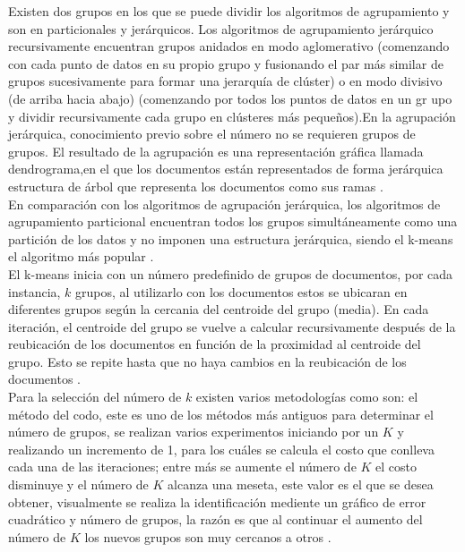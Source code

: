 Existen dos grupos en los que se puede dividir los algoritmos de agrupamiento y son en particionales y jerárquicos. Los algoritmos de agrupamiento jerárquico recursivamente encuentran grupos anidados en modo aglomerativo (comenzando con cada punto de datos en su propio grupo y fusionando el par más similar de grupos sucesivamente para formar una jerarquía de clúster) o en modo divisivo (de arriba hacia abajo) (comenzando por todos los puntos de datos en un gr upo y dividir recursivamente cada grupo en clústeres más pequeños).En la agrupación jerárquica, conocimiento previo sobre el número no se requieren grupos de grupos. El resultado de la agrupación es una representación gráfica llamada dendrograma,en el que los documentos están representados de forma jerárquica estructura de árbol que representa los documentos como sus ramas \cite{Renganathan2017,Jain2010}.\\

En comparación con los algoritmos de agrupación jerárquica, los algoritmos de agrupamiento  particional encuentran todos los grupos simultáneamente como una partición de los datos y no imponen una estructura jerárquica, siendo el k-means el algoritmo más popular \cite{Jain2010}. \\

El k-means inicia con un número predefinido de grupos de documentos, por cada instancia, $k$ grupos, al utilizarlo con los documentos estos se ubicaran en diferentes grupos según  la cercania del centroide del grupo (media). En cada iteración, el centroide del grupo se vuelve a calcular recursivamente después de la reubicación de los documentos en función de la proximidad al centroide del grupo. Esto se repite hasta que no haya cambios en la reubicación de los documentos \cite{Renganathan2017}. \\

Para la selección del número de $k$ existen varios metodologías como son: el método del codo, este es uno de los métodos más antiguos para determinar el número de grupos, se realizan varios experimentos iniciando por un $K$  y realizando un incremento de 1, para los cuáles se calcula el costo que conlleva cada una de las iteraciones; entre más se aumente el número de $K$ el costo disminuye y el número de $K$ alcanza una meseta, este valor es el que se desea obtener, visualmente se realiza la identificación mediente un gráfico de error cuadrático y número de grupos, la razón es que al continuar el aumento del número de $K$ los nuevos grupos son muy cercanos a otros \cite{Kodinariya2013}.\\ 

